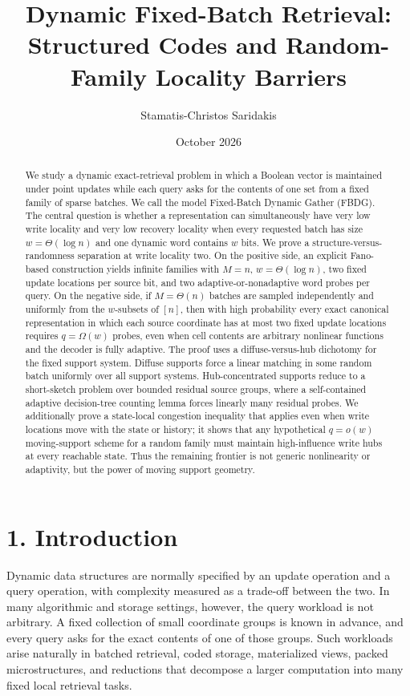 \documentclass[
]{article}
\title{Dynamic Fixed-Batch Retrieval: Structured Codes and Random-Family
Locality Barriers}
\author{Stamatis-Christos Saridakis}
\date{October 2026}
\begin{document}
\maketitle
\begin{abstract}
We study a dynamic exact-retrieval problem in which a Boolean vector is
maintained under point updates while each query asks for the contents of
one set from a fixed family of sparse batches. We call the model
Fixed-Batch Dynamic Gather (FBDG). The central question is whether a
representation can simultaneously have very low write locality and very
low recovery locality when every requested batch has size
\(w=\Theta(\log n)\) and one dynamic word contains \(w\) bits. We prove
a structure-versus-randomness separation at write locality two. On the
positive side, an explicit Fano-based construction yields infinite
families with \(M=n\), \(w=\Theta(\log n)\), two fixed update locations
per source bit, and two adaptive-or-nonadaptive word probes per query.
On the negative side, if \(M=\Theta(n)\) batches are sampled
independently and uniformly from the \(w\)-subsets of \([n]\), then with
high probability every exact canonical representation in which each
source coordinate has at most two fixed update locations requires
\(q=\Omega(w)\) probes, even when cell contents are arbitrary nonlinear
functions and the decoder is fully adaptive. The proof uses a
diffuse-versus-hub dichotomy for the fixed support system. Diffuse
supports force a linear matching in some random batch uniformly over all
support systems. Hub-concentrated supports reduce to a short-sketch
problem over bounded residual source groups, where a self-contained
adaptive decision-tree counting lemma forces linearly many residual
probes. We additionally prove a state-local congestion inequality that
applies even when write locations move with the state or history; it
shows that any hypothetical \(q=o(w)\) moving-support scheme for a
random family must maintain high-influence write hubs at every reachable
state. Thus the remaining frontier is not generic nonlinearity or
adaptivity, but the power of moving support geometry.
\end{abstract}

\hypertarget{introduction}{%
\section{1. Introduction}\label{introduction}}

Dynamic data structures are normally specified by an update operation
and a query operation, with complexity measured as a trade-off between
the two. In many algorithmic and storage settings, however, the query
workload is not arbitrary. A fixed collection of small coordinate groups
is known in advance, and every query asks for the exact contents of one
of those groups. Such workloads arise naturally in batched retrieval,
coded storage, materialized views, packed microstructures, and
reductions that decompose a larger computation into many fixed local
retrieval tasks.
\end{document}
